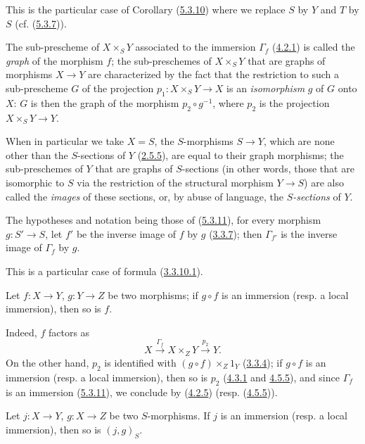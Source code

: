 This is the particular case of Corollary (\hyperref[I.5.3.10]{5.3.10})
where we replace $S$ by $Y$ and $T$ by $S$
(cf. (\hyperref[I.5.3.7]{5.3.7})).

The sub-prescheme of $X\times_S Y$ associated to the immersion $\Gamma_f$
(\hyperref[I.4.2.1]{4.2.1}) is called the \emph{graph} of the morphism $f$;
the sub-preschemes of $X\times_S Y$ that are graphs of morphisms
$X\to Y$ are characterized by the fact that the restriction to such a
sub-prescheme $G$ of the projection $p_1:X\times_S Y\to X$ is an
\emph{isomorphism} $g$ of $G$ onto $X$: $G$ is then the graph of the morphism
$p_2\circ g^{-1}$, where $p_2$ is the projection $X\times_S Y\to Y$.

When in particular we take $X=S$, the $S$-morphisms $S\to Y$, which are
none other than the $S$-sections of $Y$ (\hyperref[I.2.5.5]{2.5.5}), are
equal to their graph morphisms; the sub-preschemes of $Y$ that are
graphs of $S$-sections (in other words, those that are isomorphic to $S$ via
the restriction of the structural morphism $Y\to S$) are also called the
\emph{images} of these sections, or, by abuse of language, the
\emph{$S$-sections} of $Y$.

\begin{corollary}[5.3.12]
\label{I.5.3.12}
The hypotheses and notation being those of
(\hyperref[I.5.3.11]{5.3.11}), for every morphism $g:S'\to S$, let $f'$
be the inverse image of $f$ by $g$ (\hyperref[I.3.3.7]{3.3.7}); then
$\Gamma_{f'}$ is the inverse image of $\Gamma_f$ by $g$.
\end{corollary}

This is a particular case of formula
(\hyperref[I.3.3.10.1]{3.3.10.1}).

\begin{corollary}[5.3.13]
\label{I.5.3.13}
Let $f:X\to Y$, $g:Y\to Z$ be two morphisms; if $g\circ f$ is an
immersion (resp. a local immersion), then so is $f$.
\end{corollary}

Indeed, $f$ factors as
\[
  X\xrightarrow{\Gamma_f}X\times_Z Y\xrightarrow{p_2}Y.
\]
On the other hand, $p_2$ is identified with $(g\circ f)\times_Z 1_Y$
(\hyperref[I.3.3.4]{3.3.4}); if $g\circ f$ is an immersion (resp. a
local immersion), then so is $p_2$
(\hyperref[I.4.3.1]{4.3.1} and \hyperref[I.4.5.5]{4.5.5}), and since
$\Gamma_f$ is an immersion (\hyperref[I.5.3.11]{5.3.11}), we conclude
by (\hyperref[I.4.2.5]{4.2.5}) (resp.
(\hyperref[I.4.5.5]{4.5.5})).

\begin{corollary}[5.3.14]
\label{I.5.3.14}
Let $j:X\to Y$, $g:X\to Z$ be two $S$-morphisms. If $j$ is an immersion
(resp. a local immersion), then so is $(j,g)_S$.
\end{corollary}

